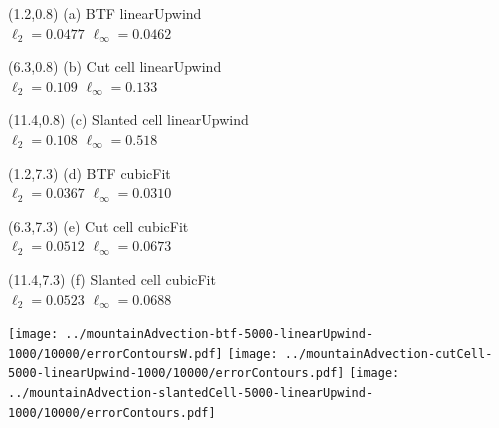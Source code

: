 \documentclass{article}
\begin{document}
\TPMargin{1pt}
\begin{textblock}{4}(1.2,0.8)
\normalsize
(a) BTF linearUpwind \\
\hspace*{1.4em}$\ell_2 = \num{0.0477}$
\hspace*{1em}$\ell_\infty = \num{0.0462}$
\end{textblock}
\begin{textblock}{4}(6.3,0.8)
\normalsize
(b) Cut cell linearUpwind \\
\hspace*{1.4em}$\ell_2 = \num{0.109}$
\hspace*{1em}$\ell_\infty = \num{0.133}$
\end{textblock}
\begin{textblock}{4}(11.4,0.8)
\normalsize
(c) Slanted cell linearUpwind \\
\hspace*{1.4em}$\ell_2 = \num{0.108}$
\hspace*{1em}$\ell_\infty = \num{0.518}$
\end{textblock}
\begin{textblock}{4}(1.2,7.3)
\normalsize
(d) BTF cubicFit \\
\hspace*{1.4em}$\ell_2 = \num{0.0367}$
\hspace*{1em}$\ell_\infty = \num{0.0310}$
\end{textblock}
\begin{textblock}{4}(6.3,7.3)
\normalsize
(e) Cut cell cubicFit \\
\hspace*{1.4em}$\ell_2 = \num{0.0512}$
\hspace*{1em}$\ell_\infty = \num{0.0673}$
\end{textblock}
\begin{textblock}{4}(11.4,7.3)
\normalsize
(f) Slanted cell cubicFit \\
\hspace*{1.4em}$\ell_2 = \num{0.0523}$
\hspace*{1em}$\ell_\infty = \num{0.0688}$
\end{textblock}
\texttt{[image: ../mountainAdvection-btf-5000-linearUpwind-1000/10000/errorContoursW.pdf]}
\hspace*{0.26em}
\texttt{[image: ../mountainAdvection-cutCell-5000-linearUpwind-1000/10000/errorContours.pdf]}
\hspace*{0.26em}
\texttt{[image: ../mountainAdvection-slantedCell-5000-linearUpwind-1000/10000/errorContours.pdf]} \\
\end{document}
